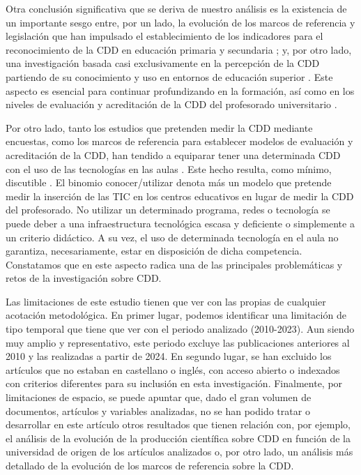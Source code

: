 \documentclass[spanish]{textolivre}
\begin{document}
Otra conclusión significativa que se deriva de nuestro análisis es la existencia de un importante sesgo entre, por un lado, la evolución de los marcos de referencia y legislación que han impulsado el establecimiento de los indicadores para el reconocimiento de la CDD en educación primaria y secundaria \cite{boe2022b}; y, por otro lado, una investigación basada casi exclusivamente en la percepción de la CDD partiendo de su conocimiento y uso en entornos de educación superior \cite{ballano2024, fernandezbatanero2021}. Este aspecto es esencial para continuar profundizando en la formación, así como en los niveles de evaluación y acreditación de la CDD del profesorado universitario \cite{barragan2021, barragan2024, caberoalmenaraetal2020, domingocoscollola2020}.

Por otro lado, tanto los estudios que pretenden medir la CDD mediante encuestas, como los marcos de referencia para establecer modelos de evaluación y acreditación de la CDD, han tendido a equiparar tener una determinada CDD con el uso de las tecnologías en las aulas \cite{alvarez2015}. Este hecho resulta, como mínimo, discutible \cite{castaneda2018, ramirez2012}. El binomio conocer/utilizar denota más un modelo que pretende medir la inserción de las TIC en los centros educativos en lugar de medir la CDD del profesorado. No utilizar un determinado programa, redes o tecnología se puede deber a una infraestructura tecnológica escasa y deficiente o simplemente a un criterio didáctico. A su vez, el uso de determinada tecnología en el aula no garantiza, necesariamente, estar en disposición de dicha competencia. Constatamos que en este aspecto radica una de las principales problemáticas y retos de la investigación sobre CDD.

Las limitaciones de este estudio tienen que ver con las propias de cualquier acotación metodológica. En primer lugar, podemos identificar una limitación de tipo temporal que tiene que ver con el periodo analizado (2010-2023). Aun siendo muy amplio y representativo, este periodo excluye las publicaciones anteriores al 2010 y las realizadas a partir de 2024. En segundo lugar, se han excluido los artículos que no estaban en castellano o inglés, con acceso abierto o indexados con criterios diferentes para su inclusión en esta investigación. Finalmente, por limitaciones de espacio, se puede apuntar que, dado el gran volumen de documentos, artículos y variables analizadas, no se han podido tratar o desarrollar en este artículo otros resultados que tienen relación con, por ejemplo, el análisis de la evolución de la producción científica sobre CDD en función de la universidad de origen de los artículos analizados o, por otro lado, un análisis más detallado de la evolución de los marcos de referencia sobre la CDD. 
\end{document}
